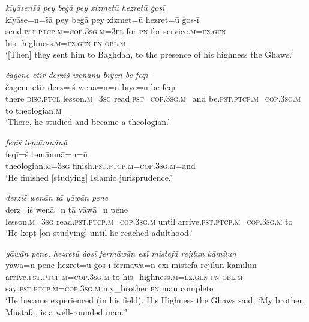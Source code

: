 \ea \label{ZP.14}
\textit{kīyāsenšā pey beġā pey xizmetū hezretū ġosī} \\ 
\gll kīyāse=n=šā pey beġā pey xizmet=ū hezret=ū ġos-ī \\ 
 send\textsc{.pst}\textsc{.ptcp}\textsc{.m}\textsc{=cop}\textsc{.3sg}\textsc{.m}\textsc{=3pl} for \textsc{pn} for service\textsc{.m}\textsc{\textsc{=ez.gen}} his\_highness\textsc{.m}\textsc{\textsc{=ez.gen}} \textsc{pn}\textsc{-obl}\textsc{.m} \\ 
\glt `[Then] they sent him to Baghdah, to the presence of his highness the Ghaws.'
\z 
 
\ea \label{ZP.15}
\textit{čāgene ētir derziš wenānū bīyen be feqī} \\ 
\gll čāgene ētir derz=iš wenā=n=ū bīye=n be feqī \\ 
 there \textsc{disc.ptcl} lesson\textsc{.m}\textsc{=3sg} read\textsc{.pst}\textsc{=cop}\textsc{.3sg}\textsc{.m}=and be\textsc{.pst}\textsc{.ptcp}\textsc{.m}\textsc{=cop}\textsc{.3sg}\textsc{.m} to theologian\textsc{.m} \\ 
\glt `There, he studied and became a theologian.'
\z 
 
\ea \label{ZP.16}
\textit{feqīš temāmnānū} \\ 
\gll feqī=š temāmnā=n=ū \\ 
 theologian\textsc{.m}\textsc{=3sg} finish\textsc{.pst}\textsc{.ptcp}\textsc{.m}\textsc{=cop}\textsc{.3sg}\textsc{.m}=and \\ 
\glt `He finished [studying] Islamic jurisprudence.'
\z 
 
\ea \label{ZP.17}
\textit{derziš wenān tā yāwān pene} \\ 
\gll derz=iš wenā=n tā yāwā=n pene \\ 
 lesson\textsc{.m}\textsc{=3sg} read\textsc{.pst}\textsc{.ptcp}\textsc{.m}\textsc{=cop}\textsc{.3sg}\textsc{.m} until arrive\textsc{.pst}\textsc{.ptcp}\textsc{.m}\textsc{=cop}\textsc{.3sg}\textsc{.m} to \\ 
\glt `He kept [on studying] until he reached adulthood.'
\z 
 
\ea \label{ZP.18}
\textit{yāwān pene, hezretū ġosī fermāwān exī mistefā rejilun kāmilun} \\ 
\gll yāwā=n pene hezret=ū ġos-ī fermāwā=n exī mistefā rejilun kāmilun \\ 
 arrive\textsc{.pst}\textsc{.ptcp}\textsc{.m}\textsc{=cop}\textsc{.3sg}\textsc{.m} to his\_highness\textsc{.m}\textsc{\textsc{=ez.gen}} \textsc{pn}\textsc{-obl}\textsc{.m} say\textsc{.pst}\textsc{.ptcp}\textsc{.m}\textsc{=cop}\textsc{.3sg}\textsc{.m} my\_brother \textsc{pn} man complete \\ 
\glt `He became experienced (in his field). His Highness the Ghaws said, ‘My brother, Mustafa, is a well-rounded man.’'
\z 
 

